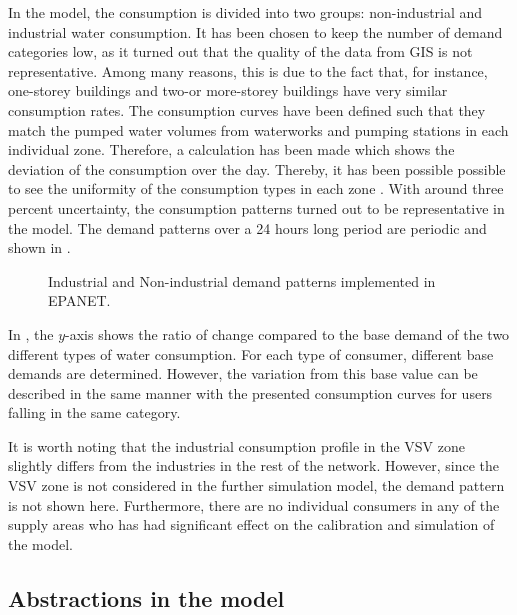 In the model, the consumption is divided into two groups: non-industrial and industrial water consumption. It has been chosen to keep the number of demand categories low, as it turned out that the quality of the data from GIS is not representative. Among many reasons, this is due to the fact that, for instance, one-storey buildings and two-or more-storey buildings have very similar consumption rates. The consumption curves have been defined such that they match the pumped water volumes from waterworks and pumping stations in each individual zone. Therefore, a calculation has been made which shows the deviation of the consumption over the day. Thereby, it has been possible possible to see the uniformity of the consumption types in each zone \cite{verdo_doc}. With around three percent uncertainty, the consumption patterns turned out to be representative in the model. The demand patterns over a 24 hours long period are periodic and shown in  .

\begin{figure}[H]
\centering

\caption{Industrial and Non-industrial demand patterns implemented in EPANET.}
\label{fig:demandpatterns_EPANET}
\end{figure}

\vspace{-3mm}

In , the $y$-axis shows the ratio of change compared to the base demand of the two different types of water consumption. For each type of consumer, different base demands are determined. However, the variation from this base value can be described in the same manner with the presented consumption curves for users falling in the same category. 

It is worth noting that the industrial consumption profile in the VSV zone slightly differs from the industries in the rest of the network. However, since the VSV zone is not considered in the further simulation model, the demand pattern is not shown here. Furthermore, there are no individual consumers in any of the supply areas who has had  significant effect on the calibration and simulation of the model. 

\subsection{Abstractions in the model}
\label{control_and_water_source_abstractions}


